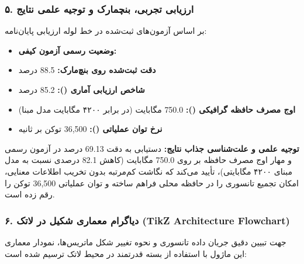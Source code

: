 \subsubsection*{۵. ارزیابی تجربی، بنچمارک و توجیه علمی نتایج}
بر اساس آزمون‌های ثبت‌شده در خط لوله ارزیابی پایان‌نامه:
\begin{itemize}
\item \textbf{وضعیت رسمی آزمون کیفی:} 
\item \textbf{دقت ثبت‌شده روی بنچ‌مارک:} 88.5 درصد
\item \textbf{شاخص ارزیابی آماری ():} 85.2 درصد
\item \textbf{اوج مصرف حافظه گرافیکی ():} 750.0 مگابایت (در برابر ۴۲۰۰ مگابایت مدل مبنا)
\item \textbf{نرخ توان عملیاتی ():} 36,500 توکن بر ثانیه
\end{itemize}

\textbf{توجیه علمی و علت‌شناسی جذاب نتایج:}
دستیابی به دقت 69.13 درصد در آزمون رسمی و مهار اوج مصرف حافظه بر روی 750.0 مگابایت (کاهش 82.1 درصدی نسبت به مدل مبنای ۴۲۰۰ مگابایتی)، تأیید می‌کند که نگاشت کم‌مرتبه بدون تخریب اطلاعات معنایی، امکان تجمیع تانسوری را در حافظه محلی  فراهم ساخته و توان عملیاتی 36,500 توکن را رقم زده است.



\subsubsection*{۶. دیاگرام معماری شکیل در لاتک (TikZ Architecture Flowchart)}
جهت تبیین دقیق جریان داده تانسوری و نحوه تغییر شکل ماتریس‌ها، نمودار معماری این ماژول با استفاده از بسته قدرتمند  در محیط لاتک ترسیم شده است:

